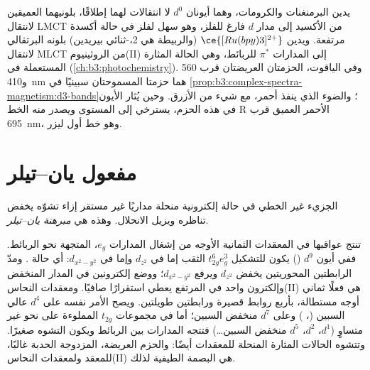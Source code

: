 يدين البرمنغنات والكرومات، وهما أيونان $d^0$ لا انتقالات  لهما إطلاقًا، بلونيهما
العميقين لانتقال LMCT من الأكسيد إلى مدار $d$ فارغ للفلز، وهو سهل لفلز في حالة أكسدة
مرتفعة. ويدين $\ce{[Ru(bpy)3]^{2+}}$ (والربيطة هي 2،-ثنائي بيريدين) بلونه البرتقالي لانتقال MLCT
من الروثينيوم(II) إلى المدارات $\pi^*$ للربائط، وهي الحالة المثارة المستعملة في
 (\cref{ch:b3:photochemistry}). وفي الياقوت، الحزمتان العريضتان
قرب 560 و\qty{410}{nm} هما حزمتا  المسموحتان سبينيًا في
\cref{prop:b3:complex-spectra-magnetism:d3-bands}؛ والضوء الذي ينفذ أحمر،
مع شيء من الأزرق. وحين يُثار الأيون في هذه الحزم، يسترخي إلى المستوى  
ويصدر منه الخط R الأحمر العميق قرب \qty{695}{nm}، وهو خط أول ليزر.

\section{مفعول يان--تيلر}

\begin{theorem}\label{thm:b3:complex-spectra-magnetism:jahn-teller}
الجزيء غير الخطي في حالة إلكترونية منحلة مداريًا غير مستقر
إزاء تشوّه يخفض تناظره ويزيل
الانحلال. وهذه هي \emph{مبرهنة يان--تيلر}.
\end{theorem}

\admitted

تنتج عواقبها في المعقدات الثمانية الأوجه من إشغال
المدارات $e_g$، المتجهة نحو الربائط. ففي أيون $d^9$ () يكون للتشكيل
$t_{2g}^6e_g^3$ الثقب إما في $d_{z^2}$ وإما في $d_{x^2-y^2}$: أي حالة . ومدّ الرابطتين
المحوريتين يخفض $d_{z^2}$ ويرفع $d_{x^2-y^2}$؛ ووضع إلكترونين في المدار المنخفض
وإلكترون واحد في المرتفع يعطي استقرارًا صافيًا. ومعقدات النحاس(II)
هي فعلًا ثماني أوجه مستطالة، بأربع روابط قصيرة ورابطتين طويلتين. ويصح الأمر نفسه
على $d^4$ عالي السبين (، ) وعلى $d^7$ منخفض السبين؛ أما في مجموعات $t_{2g}$ المملوءة على نحو غير متساوٍ
($d^1$، $d^2$، $d^5$ منخفض السبين\dots) فتتجه المدارات بين الربائط ويكون
التشوه صغيرًا. وتتشوه الحالات المثارة المنحلة للمعقدات أيضًا: 
والحزم العريضة، المزدوجة الحدبة غالبًا، للمعقد  ولمعقدات النحاس(II) هي
البصمة الطيفية لذلك.


